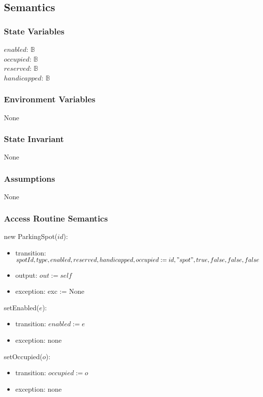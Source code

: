 \documentclass[12pt, titlepage]{article}
\begin{document}
\subsection{Semantics}

\subsubsection{State Variables}
$enabled$: $\mathbb{B}$\\
$occupied$: $\mathbb{B}$\\
$reserved$: $\mathbb{B}$\\
$handicapped$: $\mathbb{B}$\\

\subsubsection{Environment Variables}
None

\subsubsection{State Invariant}
None

\subsubsection{Assumptions}
None

\subsubsection{Access Routine Semantics}

\noindent new ParkingSpot($id$):
\begin{itemize}
\item transition: $spotId, type, enabled, reserved, handicapped, occupied := id,
"spot", \\
true, false, false, false$
\item output: $out := self$
\item exception: exc := None
\end{itemize}

\noindent setEnabled($e$):
\begin{itemize} 
\item transition: $enabled := e$
\item exception: none
\end{itemize}

\noindent setOccupied($o$):
\begin{itemize} 
\item transition: $occupied := o$
\item exception: none
\end{itemize}
\end{document}

